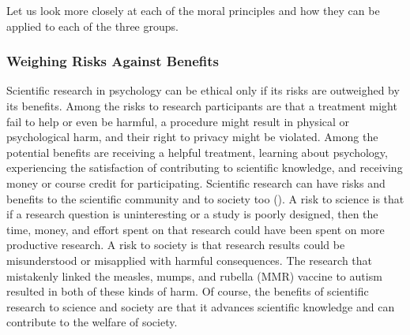 \documentclass[
]{krantz}
\begin{document}
Let us look more closely at each of the moral principles and how they can be applied to each of the three groups.

\subsubsection*{Weighing Risks Against Benefits}\label{weighing-risks-against-benefits}


Scientific research in psychology can be ethical only if its risks are outweighed by its benefits. Among the risks to research participants are that a treatment might fail to help or even be harmful, a procedure might result in physical or psychological harm, and their right to privacy might be violated. Among the potential benefits are receiving a helpful treatment, learning about psychology, experiencing the satisfaction of contributing to scientific knowledge, and receiving money or course credit for participating. Scientific research can have risks and benefits to the scientific community and to society too (). A risk to science is that if a research question is uninteresting or a study is poorly designed, then the time, money, and effort spent on that research could have been spent on more productive research. A risk to society is that research results could be misunderstood or misapplied with harmful consequences. The research that mistakenly linked the measles, mumps, and rubella (MMR) vaccine to autism resulted in both of these kinds of harm. Of course, the benefits of scientific research to science and society are that it advances scientific knowledge and can contribute to the welfare of society.
\end{document}
